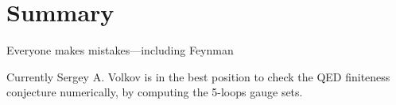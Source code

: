     

\section{Summary}
\label{sect:Summary}

\begin{bartlett}{
{Everyone makes mistakes—including {Feynman}}
        }
\end{bartlett}
\bigskip

\noindent
Currently Sergey  A. Volkov is in the best position to check the QED
finiteness conjecture numerically, by computing the 5-loops gauge sets.

